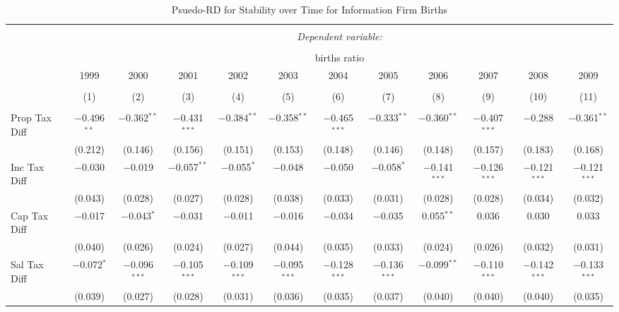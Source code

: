 
\begin{table}[!htbp] \centering 
  \caption{Psuedo-RD for Stability over Time for  Information Firm Births} 
  \label{51year} 
\small 
\begin{tabular}{@{\extracolsep{5pt}}lccccccccccc} 
\\[-1.8ex]\hline 
\hline \\[-1.8ex] 
 & \multicolumn{11}{c}{\textit{Dependent variable:}} \\ 
\cline{2-12} 
\\[-1.8ex] & \multicolumn{11}{c}{births ratio} \\ 
 & 1999 & 2000 & 2001 & 2002 & 2003 & 2004 & 2005 & 2006 & 2007 & 2008 & 2009 \\ 
\\[-1.8ex] & (1) & (2) & (3) & (4) & (5) & (6) & (7) & (8) & (9) & (10) & (11)\\ 
\hline \\[-1.8ex] 
 Prop Tax Diff & $-$0.496$^{**}$ & $-$0.362$^{**}$ & $-$0.431$^{***}$ & $-$0.384$^{**}$ & $-$0.358$^{**}$ & $-$0.465$^{***}$ & $-$0.333$^{**}$ & $-$0.360$^{**}$ & $-$0.407$^{***}$ & $-$0.288 & $-$0.361$^{**}$ \\ 
  & (0.212) & (0.146) & (0.156) & (0.151) & (0.153) & (0.148) & (0.146) & (0.148) & (0.157) & (0.183) & (0.168) \\ 
  Inc Tax Diff & $-$0.030 & $-$0.019 & $-$0.057$^{**}$ & $-$0.055$^{*}$ & $-$0.048 & $-$0.050 & $-$0.058$^{*}$ & $-$0.141$^{***}$ & $-$0.126$^{***}$ & $-$0.121$^{***}$ & $-$0.121$^{***}$ \\ 
  & (0.043) & (0.028) & (0.027) & (0.028) & (0.038) & (0.033) & (0.031) & (0.028) & (0.028) & (0.034) & (0.032) \\ 
  Cap Tax Diff & $-$0.017 & $-$0.043$^{*}$ & $-$0.031 & $-$0.011 & $-$0.016 & $-$0.034 & $-$0.035 & 0.055$^{**}$ & 0.036 & 0.030 & 0.033 \\ 
  & (0.040) & (0.026) & (0.024) & (0.027) & (0.044) & (0.035) & (0.033) & (0.024) & (0.026) & (0.032) & (0.031) \\ 
  Sal Tax Diff & $-$0.072$^{*}$ & $-$0.096$^{***}$ & $-$0.105$^{***}$ & $-$0.109$^{***}$ & $-$0.095$^{***}$ & $-$0.128$^{***}$ & $-$0.136$^{***}$ & $-$0.099$^{**}$ & $-$0.110$^{***}$ & $-$0.142$^{***}$ & $-$0.133$^{***}$ \\ 
  & (0.039) & (0.027) & (0.028) & (0.031) & (0.036) & (0.035) & (0.037) & (0.040) & (0.040) & (0.040) & (0.035) \\ 

\end{tabular}
\end{table}
